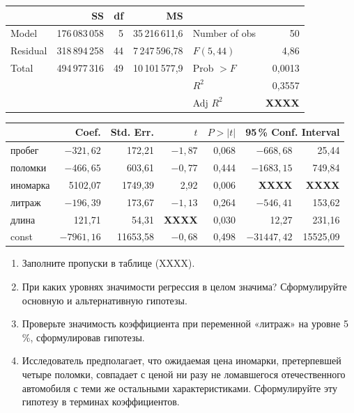 \begin{center}
\small
\begin{tabular}{lrrr @{\qquad} lr}
\toprule
       & SS & df & MS & \multicolumn{2}{l}{} \\
\midrule
Model    & 176\,083\,058 &  5 & 35\,216\,611,6 & Number of obs & 50 \\
Residual & 318\,894\,258 & 44 &  7\,247\,596,78 & $F(5, 44)$ & 4,86 \\
Total    & 494\,977\,316 & 49 & 10\,101\,577,9 & Prob $> F$ & 0,0013 \\
         &               &    &                & $R^2$ & 0,3557 \\
         &               &    &                & Adj $R^2$ & \textbf{XXXX} \\
\bottomrule
\end{tabular}

\medskip
\begin{tabular}{lrrrrrr}
\toprule
 & Coef. & Std. Err. & $t$ & $P>|t|$ & \multicolumn{2}{c}{95\,\% Conf. Interval} \\
\midrule
пробег   & $-321{,}62$ & 172,21 & $-1{,}87$ & 0,068 & $-668{,}68$ & 25,44 \\
поломки  & $-466{,}65$ & 603,61 & $-0{,}77$ & 0,444 & $-1683{,}15$ & 749,84 \\
иномарка & 5102,07 & 1749,39 & 2,92 & 0,006 & \textbf{XXXX} & \textbf{XXXX} \\
литраж   & $-196{,}39$ & 173,67 & $-1{,}13$ & 0,264 & $-546{,}41$ & 153,62 \\
длина    & 121,71 & 54,31 & \textbf{XXXX} & 0,030 & 12,27 & 231,16 \\
const    & $-7961{,}16$ & 11653,58 & $-0{,}68$ & 0,498 & $-31447{,}42$ & 15525,09 \\
\bottomrule
\end{tabular}
\end{center}

\begin{enumerate}[label=\asbuk*), leftmargin=2.2em, itemsep=3pt]
  \item Заполните пропуски в таблице (XXXX).
  \item При каких уровнях значимости регрессия в целом значима?
        Сформулируйте основную и альтернативную гипотезы.
  \item Проверьте значимость коэффициента при переменной «литраж» на уровне
        5\,\%, сформулировав гипотезы.
  \item Исследователь предполагает, что ожидаемая цена иномарки, претерпевшей
        четыре поломки, совпадает с ценой ни разу не ломавшегося отечественного
        автомобиля с теми же остальными характеристиками. Сформулируйте эту
        гипотезу в терминах коэффициентов.
\end{enumerate}


